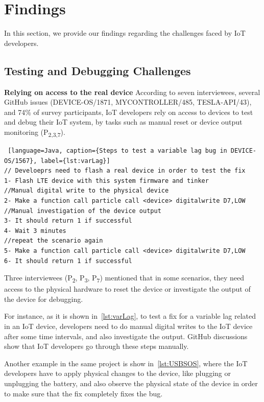 {\section{Findings}
In this section, we provide our findings regarding the challenges faced by IoT developers.

\subsection{Testing and Debugging Challenges}
\textbf{Relying on access to the real device}
According to seven interviewees, several GitHub issues (DEVICE-OS/1871, MYCONTROLLER/485, TESLA-API/43), and 74\% of survey participants, IoT developers rely on access to devices to test and debug their IoT system, by tasks such as manual reset or device output monitoring (P\textsubscript{2,3,7}).

\begin{lstlisting} [language=Java, caption={Steps to test a variable lag bug in DEVICE-OS/1567}, label={lst:varLag}] 
// Develoeprs need to flash a real device in order to test the fix
1- Flash LTE device with this system firmware and tinker
//Manual digital write to the physical device
2- Make a function call particle call <device> digitalwrite D7,LOW 
//Manual investigation of the device output
3- It should return 1 if successful   
4- Wait 3 minutes 
//repeat the scenario again
5- Make a function call particle call <device> digitalwrite D7,LOW
6- It should return 1 if successful 
\end{lstlisting}



Three interviewees (P\textsubscript{2}, P\textsubscript{3}, P\textsubscript{7}) mentioned that in some scenarios, they need access to the physical hardware to reset the device or investigate the output of the device for debugging.

 For instance, as it is shown in~\autoref{lst:varLag}, to test a fix for a variable lag related in an IoT device, developers need to do manual digital writes to the IoT device after some time intervals, and also investigate the output. GitHub discussions show that IoT developers go through these steps manually.
 
 Another example in the same project is show in~\autoref{lst:USBSOS}, where the IoT developers have to apply physical changes to the device, like plugging or unplugging the battery, and also observe the physical state of the device in order to make sure that the fix completely fixes the bug. 
 
}
